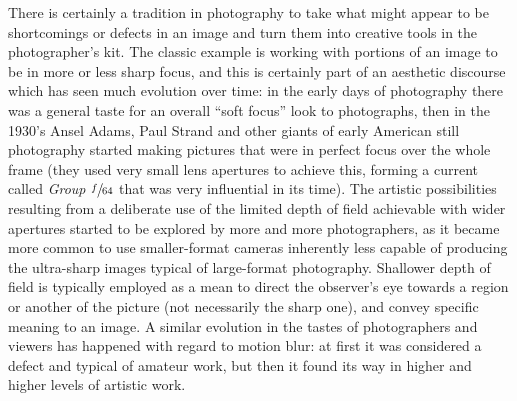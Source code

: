 There is certainly a tradition in photography to take what might appear to be shortcomings
or defects in an image and turn them into creative tools in the photographer's kit.
The classic example is working with portions of an image to be in more or less sharp focus,
and this is certainly part of an aesthetic discourse which has seen much evolution over time: 
in the early days of photography there was a general taste for an overall ``soft focus'' look
to photographs, then in the 1930's Ansel Adams, Paul Strand and other giants of early American 
still photography started making pictures that were in perfect focus over the whole frame 
(they used very small lens apertures to achieve this, forming a current called 
\emph{Group $\sfrac{f}{64}$} that was very influential in its time). 
The artistic possibilities resulting from a deliberate use of the limited \gls{depth of field} 
achievable with wider \glspl{aperture} started to be explored by more and more photographers,
as it became more common to use smaller-format cameras inherently less capable of producing the
ultra-sharp images typical of large-format photography.
Shallower depth of field is typically employed as a mean to direct the observer's eye towards 
a region or another of the picture (not necessarily the sharp one), and convey specific meaning to an image. 
A similar evolution in the tastes of photographers and viewers has happened with regard to \gls{motion blur}:
at first it was considered a defect and typical of amateur work, 
but then it found its way in higher and higher levels of artistic work.

